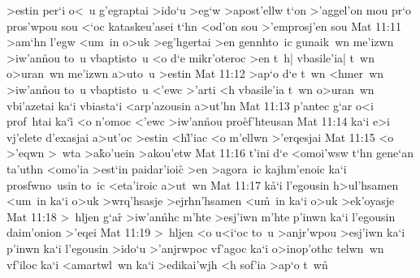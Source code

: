 >estin
per`i
o<~u
g'egraptai
>ido`u
>eg`w
>apost'ellw
t`on
>'aggel'on
mou
pr`o
pros'wpou
sou
<`oc
kataskeu'asei
t`hn
<od'on
sou
>'emprosj'en
sou\bibvsend
\vs Mat 11:11
>am`hn
l'egw
<um~in
o>uk
>eg'hgertai
>en
gennhto~ic
gunaik~wn
me'izwn
>iw'an\r{n}ou
to~u
vbaptisto~u
<o
d`e
mikr'oteroc
>en
t~h|
vbasile'ia|
t~wn
o>uran~wn
me'izwn
a>uto~u
>estin\bibvsend
\vs Mat 11:12
>ap`o
d`e
t~wn
<hmer~wn
>iw'an\r{n}ou
to~u
vbaptisto~u
<'ewc
>'arti
<h
vbasile'ia
t~wn
o>uran~wn
vbi'azetai
ka`i
vbiasta`i
<arp'azousin
a>ut'hn\bibvsend
\vs Mat 11:13
p'antec
g`ar
o<i
prof~htai
ka`i\r{}
<o
n'omoc
<'ewc
>iw'an\r{n}ou
pro\r{e}f'hteusan\bibvsend
{}
\vs Mat 11:14
ka`i
e>i
vj'elete
d'exasjai
a>ut'oc
>estin
<h\r{l}'iac
<o
m'ellwn
>'erqesjai\bibvsend
\vs Mat 11:15
<o
>'eqwn
>~wta
>a\r{k}o'uein
>akou'etw\bibvsend
\vs Mat 11:16
t'ini
d`e
<omoi'wsw
t`hn
gene`an
ta'uthn
<omo'ia
>est`in
paidar'ioic\r{}
>en
>agora~ic
kajhm'enoic
ka`i
prosfwno~usin
to~ic
<eta'iroic
a>ut~wn\bibvsend
\vs Mat 11:17
k\r{a}`i
l'egousin
h>ul'hsamen
<um~in
ka`i
o>uk
>wrq'hsasje
>ejrhn'hsamen
<u\r{m}~in
ka`i
o>uk
>ek'oyasje\bibvsend
\vs Mat 11:18
>~hljen
g`a\r{r}
>iw'an\r{n}hc
m'hte
>esj'iwn
m'hte
p'inwn
ka`i
l'egousin
daim'onion
>'eqei\bibvsend
\vs Mat 11:19
>~hljen
<o
u<i`oc
to~u
>anjr'wpou
>esj'iwn
ka`i
p'inwn
ka`i
l'egousin
>ido`u
>'anjrwpoc
vf'agoc
ka`i
o>inop'othc
telwn~wn
vf'iloc
ka`i
<amartwl~wn
ka`i
>edikai'wjh
<h
sof'ia
>ap`o
t~wn\r{}
